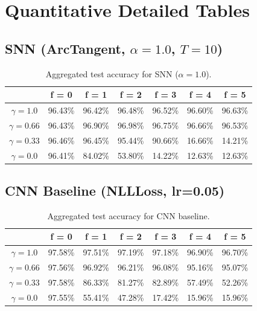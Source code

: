 \documentclass{article}
\begin{document}
\newpage

\section{Quantitative Detailed Tables}

\subsection{SNN (ArcTangent, $\alpha = 1.0$, $T=10$)}
\begin{table}[htbp]
    \centering
    \begin{tabular}{ccccccc}
        \toprule
        & \textbf{f = 0} & \textbf{f = 1} & \textbf{f = 2} & \textbf{f = 3} & \textbf{f = 4} & \textbf{f = 5} \\
        \midrule
        $\gamma = 1.0$ & 96.43\% & 96.42\% & 96.48\% & 96.52\% & 96.60\% & 96.63\% \\
        $\gamma = 0.66$ & 96.43\% & 96.90\% & 96.98\% & 96.75\% & 96.66\% & 96.53\% \\
        $\gamma = 0.33$ & 96.46\% & 96.45\% & 95.44\% & 90.66\% & 16.66\% & 14.21\% \\
        $\gamma = 0.0$ & 96.41\% & 84.02\% & 53.80\% & 14.22\% & 12.63\% & 12.63\% \\
        \bottomrule
    \end{tabular}
    \caption{Aggregated test accuracy for SNN ($\alpha=1.0$).}
\end{table}

\subsection{CNN Baseline (NLLLoss, lr=0.05)}
\begin{table}[htbp]
    \centering
    \begin{tabular}{ccccccc}
        \toprule
        & \textbf{f = 0} & \textbf{f = 1} & \textbf{f = 2} & \textbf{f = 3} & \textbf{f = 4} & \textbf{f = 5} \\
        \midrule
        $\gamma = 1.0$ & 97.58\% & 97.51\% & 97.19\% & 97.18\% & 96.90\% & 96.70\% \\
        $\gamma = 0.66$ & 97.56\% & 96.92\% & 96.21\% & 96.08\% & 95.16\% & 95.07\% \\
        $\gamma = 0.33$ & 97.58\% & 86.33\% & 81.27\% & 82.89\% & 57.49\% & 52.26\% \\
        $\gamma = 0.0$ & 97.55\% & 55.41\% & 47.28\% & 17.42\% & 15.96\% & 15.96\% \\
        \bottomrule
    \end{tabular}
    \caption{Aggregated test accuracy for CNN baseline.}
\end{table}
\end{document}
